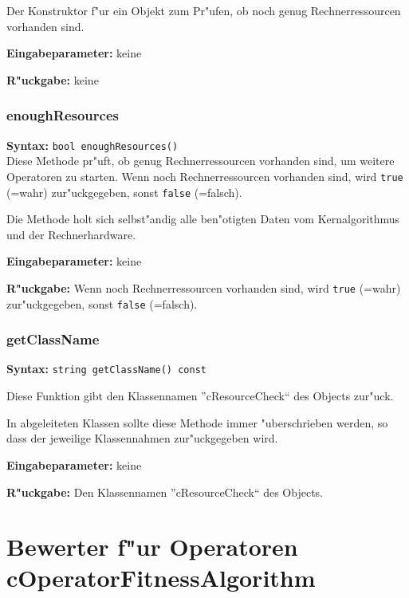 Der Konstruktor f"ur ein Objekt zum Pr"ufen, ob noch genug Rechnerressourcen vorhanden sind.

\bigskip\noindent
\textbf{Eingabeparameter:} keine

\bigskip\noindent
\textbf{R"uckgabe:} keine


\subsubsection{enoughResources}

\textbf{Syntax:} \verb|bool enoughResources()| \\

Diese Methode pr"uft, ob genug Rechnerressourcen vorhanden sind, um weitere Operatoren zu starten. Wenn noch Rechnerressourcen vorhanden sind, wird \verb|true| (=wahr) zur"uckgegeben, sonst \verb|false| (=falsch).

Die Methode holt sich selbst"andig alle ben"otigten Daten vom Kernalgorithmus und der Rechnerhardware.

\bigskip\noindent
\textbf{Eingabeparameter:} keine

\bigskip\noindent
\textbf{R"uckgabe:} Wenn noch Rechnerressourcen vorhanden sind, wird \verb|true| (=wahr) zur"uckgegeben, sonst \verb|false| (=falsch).


\subsubsection{getClassName}

\textbf{Syntax:} \verb|string getClassName() const|

\bigskip\noindent
Diese Funktion gibt den Klassennamen ''cResourceCheck`` des Objects zur"uck.

In abgeleiteten Klassen sollte diese Methode immer "uberschrieben werden, so dass der jeweilige Klassennahmen zur"uckgegeben wird.

\bigskip\noindent
\textbf{Eingabeparameter:} keine

\bigskip\noindent
\textbf{R"uckgabe:} Den Klassennamen ''cResourceCheck`` des Objects.



\section{Bewerter f"ur Operatoren cOperatorFitnessAlgorithm}
\label{secCOperationFitnessAlgorithmus}


